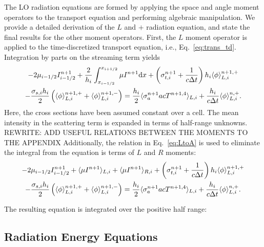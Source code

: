 The LO radiation equations are formed by applying the space and angle moment operators to the
transport equation and performing algebraic manipulation.  We provide a detailed
derivation of the $L$ and $+$ radiation equation, and state the final results for the
other moment operators.  First, the $L$ moment operator is applied to the time-discretized transport equation,
i.e., Eq.~\eqref{eq:trans_td}.  Integration by parts on the streaming term yields
\begin{multline}\label{eq:spat_mom}
    -2{\mu}_{i-1/2} I_{i-1/2}^{n+1} + \frac{2}{h_i}\int_{{x_{i-1/2}}}^{{x_{i+1/2}}} \mu I^{n+1} \mathrm{d} x
        +  \left(\sigma_{t,i}^{n+1}+\frac{1}{c \Delta t} \right) h_i 
  \langle \phi \rangle_{L,i}^{n+1,+} \\-  \frac{\sigma_{s,i} h_i}{2} \left( \langle \phi \rangle_{L,i}^{n+1,+} +
  \langle \phi \rangle_{L,i}^{n+1,-}\right) = \frac{h_i}{2} \langle \sigma_a^{n+1} a c T^{n+1,4} \rangle_{L,i} +
  \frac{h_i}{c\Delta t}\langle \phi \rangle_{L,i}^{n,+}.
\end{multline}
Here, the cross sections have been assumed constant over a cell.  The mean
intensity in the scattering term is expanded in terms of half-range unknowns.
REWRITE: ADD USEFUL RELATIONS BETWEEN THE MOMENTS TO THE APPENDIX
Additionally, the relation in Eq.~\eqref{eq:LtoA} is used to eliminate the integral from the
equation is terms of $L$ and $R$ moments:
\begin{multline}\label{eq:spat_mom}
    -2{\mu}_{i-1/2} I_{i-1/2}^{n+1} + \langle \mu I^{n+1} \rangle_{L,i} + \langle \mu I^{n+1} \rangle_{R,i} 
        +  \left(\sigma_{t,i}^{n+1}+\frac{1}{c \Delta t} \right) h_i 
  \langle \phi \rangle_{L,i}^{n+1,+} \\-  \frac{\sigma_{s,i} h_i}{2} \left( \langle \phi \rangle_{L,i}^{n+1,+} +
  \langle \phi \rangle_{L,i}^{n+1,-}\right) = \frac{h_i}{2} \langle \sigma_a^{n+1} a c T^{n+1,4} \rangle_{L,i} +
  \frac{h_i}{c\Delta t}\langle \phi \rangle_{L,i}^{n,+}.
\end{multline}

The resulting equation is integrated over the positive half range:












\subsection{Radiation Energy Equations}

